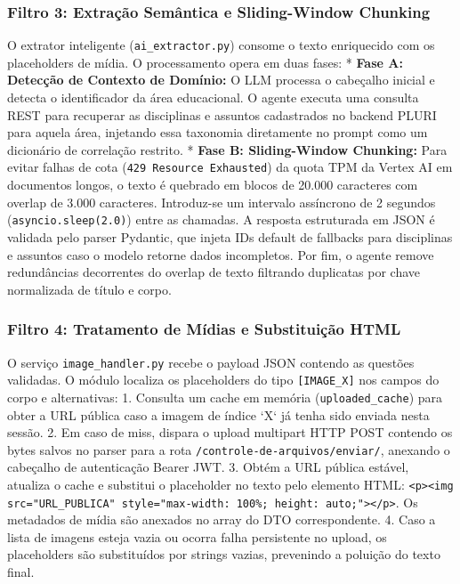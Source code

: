 \documentclass[sigconf]{acmart}
\begin{document}
\subsubsection{Filtro 3: Extração Semântica e Sliding-Window Chunking}
O extrator inteligente (\lstinline{ai_extractor.py}) consome o texto enriquecido com os placeholders de mídia. O processamento opera em duas fases:
* \textbf{Fase A: Detecção de Contexto de Domínio:} O LLM processa o cabeçalho inicial e detecta o identificador da área educacional. O agente executa uma consulta REST para recuperar as disciplinas e assuntos cadastrados no backend PLURI para aquela área, injetando essa taxonomia diretamente no prompt como um dicionário de correlação restrito.
* \textbf{Fase B: Sliding-Window Chunking:} Para evitar falhas de cota (\lstinline{429 Resource Exhausted}) da quota TPM da Vertex AI em documentos longos, o texto é quebrado em blocos de 20.000 caracteres com overlap de 3.000 caracteres. Introduz-se um intervalo assíncrono de 2 segundos (\lstinline{asyncio.sleep(2.0)}) entre as chamadas. A resposta estruturada em JSON é validada pelo parser Pydantic, que injeta IDs default de fallbacks para disciplinas e assuntos caso o modelo retorne dados incompletos. Por fim, o agente remove redundâncias decorrentes do overlap de texto filtrando duplicatas por chave normalizada de título e corpo.

\subsubsection{Filtro 4: Tratamento de Mídias e Substituição HTML}
O serviço \lstinline{image_handler.py} recebe o payload JSON contendo as questões validadas. O módulo localiza os placeholders do tipo \lstinline{[IMAGE_X]} nos campos do corpo e alternativas:
1. Consulta um cache em memória (\lstinline{uploaded_cache}) para obter a URL pública caso a imagem de índice `X` já tenha sido enviada nesta sessão.
2. Em caso de miss, dispara o upload multipart HTTP POST contendo os bytes salvos no parser para a rota \lstinline{/controle-de-arquivos/enviar/}, anexando o cabeçalho de autenticação Bearer JWT.
3. Obtém a URL pública estável, atualiza o cache e substitui o placeholder no texto pelo elemento HTML: \lstinline{<p><img src="URL_PUBLICA" style="max-width: 100%; height: auto;"></p>}. Os metadados de mídia são anexados no array do DTO correspondente.
4. Caso a lista de imagens esteja vazia ou ocorra falha persistente no upload, os placeholders são substituídos por strings vazias, prevenindo a poluição do texto final.
\end{document}
